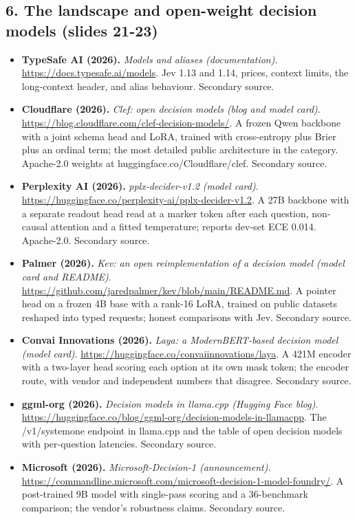 \documentclass[11pt,letterpaper]{article}
\begin{document}
\subsection*{6. The landscape and open-weight decision models (slides 21-23)}
\begin{itemize}[leftmargin=1.2em,itemsep=3pt]\sloppy
\item \textbf{TypeSafe AI (2026).} \textit{Models and aliases (documentation)}. \url{https://docs.typesafe.ai/models}. Jev 1.13 and 1.14, prices, context limits, the long-context header, and alias behaviour. Secondary source.
\item \textbf{Cloudflare (2026).} \textit{Clef: open decision models (blog and model card)}. \url{https://blog.cloudflare.com/clef-decision-models/}. A frozen Qwen backbone with a joint schema head and LoRA, trained with cross-entropy plus Brier plus an ordinal term; the most detailed public architecture in the category. Apache-2.0 weights at huggingface.co/Cloudflare/clef. Secondary source.
\item \textbf{Perplexity AI (2026).} \textit{pplx-decider-v1.2 (model card)}. \url{https://huggingface.co/perplexity-ai/pplx-decider-v1.2}. A 27B backbone with a separate readout head read at a marker token after each question, non-causal attention and a fitted temperature; reports dev-set ECE 0.014. Apache-2.0. Secondary source.
\item \textbf{Palmer (2026).} \textit{Kev: an open reimplementation of a decision model (model card and README)}. \url{https://github.com/jaredpalmer/kev/blob/main/README.md}. A pointer head on a frozen 4B base with a rank-16 LoRA, trained on public datasets reshaped into typed requests; honest comparisons with Jev. Secondary source.
\item \textbf{Convai Innovations (2026).} \textit{Laya: a ModernBERT-based decision model (model card)}. \url{https://huggingface.co/convaiinnovations/laya}. A 421M encoder with a two-layer head scoring each option at its own mask token; the encoder route, with vendor and independent numbers that disagree. Secondary source.
\item \textbf{ggml-org (2026).} \textit{Decision models in llama.cpp (Hugging Face blog)}. \url{https://huggingface.co/blog/ggml-org/decision-models-in-llamacpp}. The /v1/systemone endpoint in llama.cpp and the table of open decision models with per-question latencies. Secondary source.
\item \textbf{Microsoft (2026).} \textit{Microsoft-Decision-1 (announcement)}. \url{https://commandline.microsoft.com/microsoft-decision-1-model-foundry/}. A post-trained 9B model with single-pass scoring and a 36-benchmark comparison; the vendor's robustness claims. Secondary source.

\end{itemize}
\end{document}
